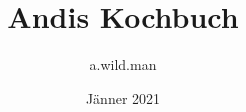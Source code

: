 \documentclass[a4paper,12pt,twoside,open=right,%
onecolumn,BCOR=10mm]{book}
\begin{document}
\author{a.wild.man}
\title{Andis Kochbuch}
\date{Jänner 2021}

\maketitle
\tableofcontents
 \setcounter{page}{1}





\end{document}
